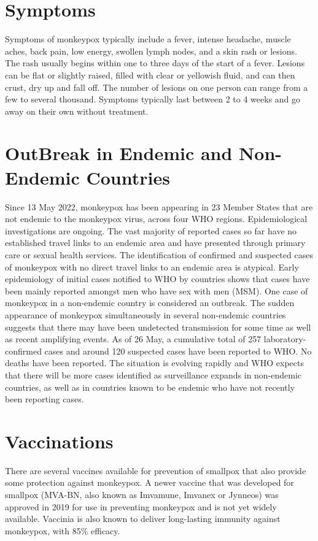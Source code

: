 \section{Symptoms}
Symptoms of monkeypox typically include a fever, intense headache, muscle aches, back pain, low energy, swollen lymph nodes, and a skin rash or lesions. The rash usually begins within one to three days of the start of a fever. Lesions can be flat or slightly raised, filled with clear or yellowish fluid, and can then crust, dry up and fall off. The number of lesions on one person can range from a few to several thousand. Symptoms typically last between 2 to 4 weeks and go away on their own without treatment.

\section{OutBreak in Endemic and Non-Endemic Countries}
Since 13 May 2022, monkeypox has been appearing in 23 Member States that are not endemic to the monkeypox virus, across four WHO regions. Epidemiological investigations are ongoing. The vast majority of reported cases so far have no established travel links to an endemic area and have presented through primary care or sexual health services. The identification of confirmed and suspected cases of monkeypox with no direct travel links to an endemic area is atypical. Early epidemiology of initial cases notified to WHO by countries shows that cases have been mainly reported amongst men who have sex with men (MSM). One case of monkeypox in a non-endemic country is considered an outbreak. The sudden appearance of monkeypox simultaneously in several non-endemic countries suggests that there may have been undetected transmission for some time as well as recent amplifying events.
As of 26 May, a cumulative total of 257 laboratory-confirmed cases and around 120 suspected cases have been reported to WHO. No deaths have been reported.
The situation is evolving rapidly and WHO expects that there will be more cases identified as surveillance expands in non-endemic countries, as well as in countries known to be endemic who have not recently been reporting cases.

\section{Vaccinations}
There are several vaccines available for prevention of smallpox that also provide some protection against monkeypox. A newer vaccine that was developed for smallpox (MVA-BN, also known as Imvamune, Imvanex or Jynneos) was approved in 2019 for use in preventing monkeypox and is not yet widely available. Vaccinia is also known to deliver long-lasting immunity against
monkeypox, with 85\% efficacy.

